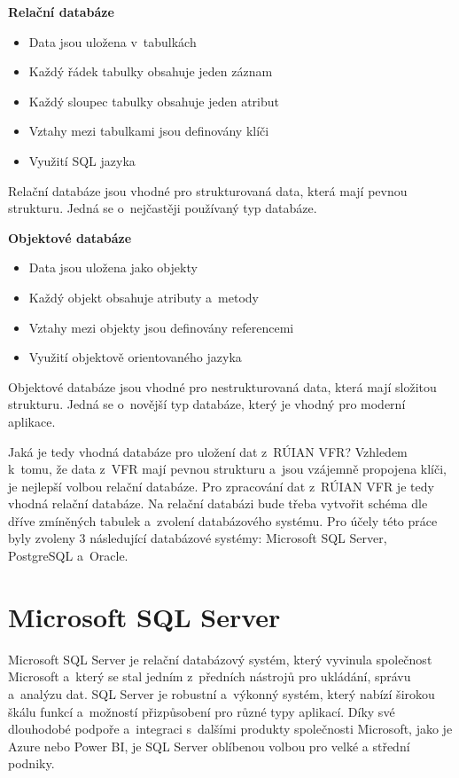 \documentclass[czech, kiv, ba, he, iso690auyr, pdf]{fasthesis}
\begin{document}
\textbf{Relační databáze}
\begin{itemize}[itemsep=-2pt]
    \item Data jsou uložena v~tabulkách
    \item Každý řádek tabulky obsahuje jeden záznam
    \item Každý sloupec tabulky obsahuje jeden atribut
    \item Vztahy mezi tabulkami jsou definovány klíči
    \item Využití SQL jazyka
\end{itemize}
Relační databáze jsou vhodné pro strukturovaná data, která mají pevnou strukturu.
Jedná se o~nejčastěji používaný typ databáze.


\textbf{Objektové databáze}
\begin{itemize}[itemsep=-2pt]
    \item Data jsou uložena jako objekty
    \item Každý objekt obsahuje atributy a~metody
    \item Vztahy mezi objekty jsou definovány referencemi
    \item Využití objektově orientovaného jazyka
\end{itemize}
Objektové databáze jsou vhodné pro nestrukturovaná data, která mají složitou strukturu.
Jedná se o~novější typ databáze, který je vhodný pro moderní aplikace.

Jaká je tedy vhodná databáze pro uložení dat z~RÚIAN VFR?
Vzhledem k~tomu, že data z~VFR mají pevnou strukturu a~jsou vzájemně propojena klíči, 
je nejlepší volbou relační databáze. Pro zpracování dat z~RÚIAN VFR je tedy vhodná relační databáze.
Na relační databázi bude třeba vytvořit schéma dle dříve zmíněných tabulek a~zvolení databázového systému.
Pro účely této práce byly zvoleny 3 následující databázové systémy: Microsoft SQL Server, PostgreSQL a~Oracle.

\section{Microsoft SQL Server}
Microsoft SQL Server je relační databázový systém, který vyvinula společnost 
Microsoft a~který se stal jedním z~předních nástrojů pro ukládání, správu a~analýzu dat. 
SQL Server je robustní a~výkonný systém, který nabízí širokou škálu funkcí 
a~možností přizpůsobení pro různé typy aplikací. Díky své dlouhodobé podpoře a~integraci 
s~dalšími produkty společnosti Microsoft, jako je Azure nebo Power BI, je SQL Server 
oblíbenou volbou pro velké a střední podniky.
\end{document}
